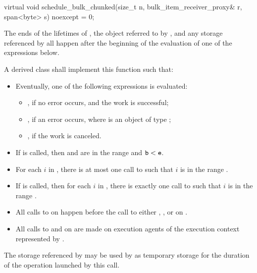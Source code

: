 %
\begin{itemdecl}
virtual void schedule_bulk_chunked(size_t n, bulk_item_receiver_proxy& r,
                                   span<byte> s) noexcept = 0;
\end{itemdecl}

\begin{itemdescr}
\pnum
\expects
The ends of
the lifetimes of ,
the object referred to by , and
any storage referenced by 
all happen after
the beginning of the evaluation of one of the expressions below.

\pnum
\effects
A derived class shall implement this function such that:
\begin{itemize}
\item
Eventually, one of the following expressions is evaluated:
\begin{itemize}
\item
{}, if no error occurs, and the work is successful;
\item
{}, if an error occurs,
where  is an object of type ;
\item
{}, if the work is canceled.
\end{itemize}
\item
If  is called,
then  and  are in the range  and
$\texttt{\protect b} < \texttt{\protect e}$.
\item
For each $i$ in ,
there is at most one call to 
such that $i$ is in the range .
\item
If  is called,
then for each $i$ in ,
there is exactly one call to 
such that $i$ is in the range .
\item
All calls to  on  happen before
the call to either , , or 
on .
\item
All calls to  and  on  are made
on execution agents of the execution context represented by .
\end{itemize}

\pnum
\remarks
The storage referenced by  may be used by 
as temporary storage for the duration of the operation launched by this call.
\end{itemdescr}


